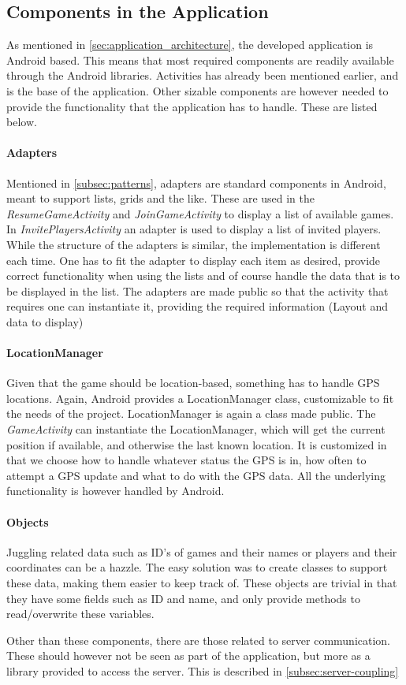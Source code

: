 \subsection{Components in the Application}

As mentioned in \ref{sec:application_architecture}, the developed application is Android based. This means that most required components are readily available through the Android libraries. Activities has already been mentioned earlier, and is the base of the application. Other sizable components are however needed to provide the functionality that the application has to handle. These are listed below.

\paragraph{Adapters}
Mentioned in \ref{subsec:patterns}, adapters are standard components in Android, meant to support lists, grids and the like. These are used in the \textit{ResumeGameActivity} and \textit{JoinGameActivity} to display a list of available games. In \textit{InvitePlayersActivity} an adapter is used to display a list of invited players. While the structure of the adapters is similar, the implementation is different each time. One has to fit the adapter to display each item as desired, provide correct functionality when using the lists and of course handle the data that is to be displayed in the list. The adapters are made public so that the activity that requires one can instantiate it, providing the required information (Layout and data to display)

\paragraph{LocationManager}
Given that the game should be location-based, something has to handle GPS locations. Again, Android provides a LocationManager class, customizable to fit the needs of the project. LocationManager is again a class made public. The \textit{GameActivity} can instantiate the LocationManager, which will get the current position if available, and otherwise the last known location. It is customized in that we choose how to handle whatever status the GPS is in, how often to attempt a GPS update and what to do with the GPS data. All the underlying functionality is however handled by Android.

\paragraph{Objects}
Juggling related data such as ID's of games and their names or players and their coordinates can be a hazzle. The easy solution was to create classes to support these data, making them easier to keep track of. These objects are trivial in that they have some fields such as ID and name, and only provide methods to read/overwrite these variables.

Other than these components, there are those related to server communication. These should however not be seen as part of the application, but more as a library provided to access the server. This is described in \ref{subsec:server-coupling}